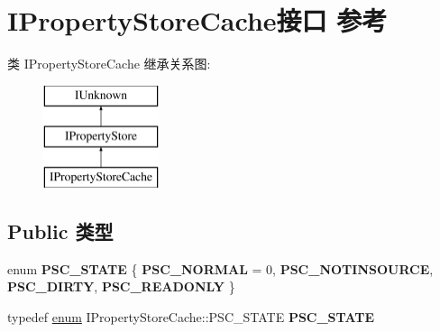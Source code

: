 \hypertarget{interface_i_property_store_cache}{}\section{I\+Property\+Store\+Cache接口 参考}
\label{interface_i_property_store_cache}
类 I\+Property\+Store\+Cache 继承关系图\+:\begin{figure}[H]
\begin{center}
\leavevmode
\includegraphics[height=3.000000cm]{interface_i_property_store_cache}
\end{center}
\end{figure}
\subsection*{Public 类型}
\begin{DoxyCompactItemize}
\item 
\mbox{\label{interface_i_property_store_cache_a79921fa855c93c14e1922c9a223abc67}} 
enum {\bfseries P\+S\+C\+\_\+\+S\+T\+A\+TE} \{ {\bfseries P\+S\+C\+\_\+\+N\+O\+R\+M\+AL} = 0, 
{\bfseries P\+S\+C\+\_\+\+N\+O\+T\+I\+N\+S\+O\+U\+R\+CE}, 
{\bfseries P\+S\+C\+\_\+\+D\+I\+R\+TY}, 
{\bfseries P\+S\+C\+\_\+\+R\+E\+A\+D\+O\+N\+LY}
 \}
\item 
\mbox{\label{interface_i_property_store_cache_a7ee7b0cc0928a87f347b2977cf732663}} 
typedef \hyperlink{interfaceenum}{enum} I\+Property\+Store\+Cache\+::\+P\+S\+C\+\_\+\+S\+T\+A\+TE {\bfseries P\+S\+C\+\_\+\+S\+T\+A\+TE}
\end{DoxyCompactItemize}
